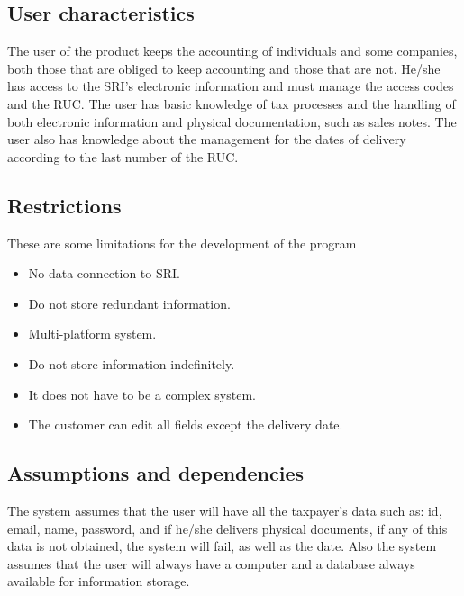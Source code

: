 \documentclass[12pt,a4paper, twosite]{article}
\begin{document}
\subsection{User characteristics}
\label{sec:orga40b0ee}

The user of the product keeps the accounting of individuals and some companies, both those that are obliged to keep accounting and those that are not. He/she has access to the SRI's electronic information and must manage the access codes and the RUC. The user has basic knowledge of tax processes and the handling of both electronic information and physical documentation, such as sales notes. The user also has knowledge about the management for the dates of delivery according to the last number of the RUC. 


\subsection{Restrictions}
\label{sec:org5ca5790}

These are some limitations for the development of the program

\begin{itemize}
\item No data connection to SRI.

\item Do not store redundant information.

\item Multi-platform system.

\item Do not store information indefinitely.

\item It does not have to be a complex system.
\item The customer can edit all fields except the delivery date. 



\end{itemize}


\subsection{Assumptions and dependencies}
\label{sec:org0ae23fe}

The system assumes that the user will have all the taxpayer's data such as: id, email, name, password, and if he/she delivers physical documents, if any of this data is not obtained, the system will fail, as well as the date. Also the system assumes that the user will always have a computer and a database always available for information storage.
\end{document}
